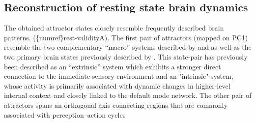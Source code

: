 \documentclass{article}
\begin{document}
\subsection{Reconstruction of resting state brain dynamics}\label{Reconstruction of resting state brain dynamics}

The obtained attractor states closely resemble frequently described brain patterns. (\{numref\}rest-validityA). The first
pair of attractors (mapped on PC1) resemble the two complementary ``macro'' systems described by and as well as the two
primary brain states previously described by . This state-pair has previously been described as an ``extrinsic'' system
which exhibits a stronger direct connection to the immediate sensory environment and an "intrinsic" system, whose
activity is primarily associated with dynamic changes in higher-level internal context and closely linked to the default
mode network. The other pair of attractors spans an orthogonal axis connecting regions that are commonly associated
with perception--action cycles
\end{document}
